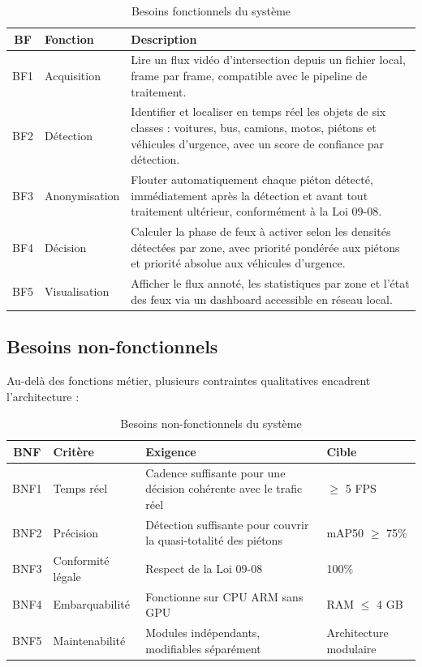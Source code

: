 \begin{table}[H]
\centering
\caption{Besoins fonctionnels du système}
\begin{tabularx}{\textwidth}{clX}
\toprule
\textbf{BF} &
\textbf{Fonction} &
\textbf{Description} \\
\midrule
BF1 & Acquisition &
Lire un flux vidéo d'intersection depuis
un fichier local, frame par frame,
compatible avec le pipeline de traitement. \\

BF2 & Détection &
Identifier et localiser en temps réel
les objets de six classes : voitures,
bus, camions, motos, piétons et véhicules
d'urgence, avec un score de confiance
par détection. \\

BF3 & Anonymisation &
Flouter automatiquement chaque piéton
détecté, immédiatement après la détection
et avant tout traitement ultérieur,
conformément à la Loi 09-08. \\

BF4 & Décision &
Calculer la phase de feux à activer
selon les densités détectées par zone,
avec priorité pondérée aux piétons et
priorité absolue aux véhicules d'urgence. \\

BF5 & Visualisation &
Afficher le flux annoté, les statistiques
par zone et l'état des feux via un
dashboard accessible en réseau local. \\
\bottomrule
\end{tabularx}
\label{tab:besoins_fonctionnels}
\end{table}

\subsection{Besoins non-fonctionnels}

Au-delà des fonctions métier, plusieurs
contraintes qualitatives encadrent
l'architecture :

\begin{table}[H]
\centering
\caption{Besoins non-fonctionnels du système}
\begin{tabularx}{\textwidth}{clXl}
\toprule
\textbf{BNF} &
\textbf{Critère} &
\textbf{Exigence} &
\textbf{Cible} \\
\midrule
BNF1 & Temps réel &
Cadence suffisante pour une décision
cohérente avec le trafic réel &
$\geq$ 5 FPS \\

BNF2 & Précision &
Détection suffisante pour couvrir
la quasi-totalité des piétons &
mAP50 $\geq$ 75\% \\

BNF3 & Conformité légale &
Respect de la Loi 09-08 &
100\% \\

BNF4 & Embarquabilité &
Fonctionne sur CPU ARM sans GPU &
RAM $\leq$ 4 GB \\

BNF5 & Maintenabilité &
Modules indépendants, modifiables
séparément &
Architecture modulaire \\
\bottomrule
\end{tabularx}
\label{tab:besoins_non_fonctionnels}
\end{table}

